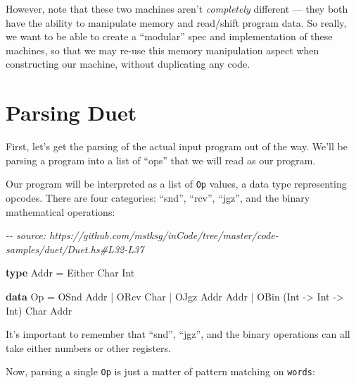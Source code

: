\documentclass[]{article}
\newenvironment{Shaded}{}{}
\newcommand{\CommentTok}[1]{\textcolor[rgb]{0.38,0.63,0.69}{\textit{#1}}}
\newcommand{\DataTypeTok}[1]{\textcolor[rgb]{0.56,0.13,0.00}{#1}}
\newcommand{\KeywordTok}[1]{\textcolor[rgb]{0.00,0.44,0.13}{\textbf{#1}}}
\newcommand{\NormalTok}[1]{#1}
\newcommand{\OperatorTok}[1]{\textcolor[rgb]{0.40,0.40,0.40}{#1}}
\newcommand{\OtherTok}[1]{\textcolor[rgb]{0.00,0.44,0.13}{#1}}
\begin{document}
However, note that these two machines aren't \emph{completely} different ---
they both have the ability to manipulate memory and read/shift program data. So
really, we want to be able to create a ``modular'' spec and implementation of
these machines, so that we may re-use this memory manipulation aspect when
constructing our machine, without duplicating any code.

\section{Parsing Duet}\label{parsing-duet}

First, let's get the parsing of the actual input program out of the way. We'll
be parsing a program into a list of ``ops'' that we will read as our program.

Our program will be interpreted as a list of \texttt{Op} values, a data type
representing opcodes. There are four categories: ``snd'', ``rcv'', ``jgz'', and
the binary mathematical operations:

\begin{Shaded}
\begin{Highlighting}[]
\CommentTok{{-}{-} source: https://github.com/mstksg/inCode/tree/master/code{-}samples/duet/Duet.hs\#L32{-}L37}

\KeywordTok{type} \DataTypeTok{Addr} \OtherTok{=} \DataTypeTok{Either} \DataTypeTok{Char} \DataTypeTok{Int}

\KeywordTok{data} \DataTypeTok{Op} \OtherTok{=} \DataTypeTok{OSnd} \DataTypeTok{Addr}
        \OperatorTok{|} \DataTypeTok{ORcv} \DataTypeTok{Char}
        \OperatorTok{|} \DataTypeTok{OJgz} \DataTypeTok{Addr} \DataTypeTok{Addr}
        \OperatorTok{|} \DataTypeTok{OBin}\NormalTok{ (}\DataTypeTok{Int} \OtherTok{{-}\textgreater{}} \DataTypeTok{Int} \OtherTok{{-}\textgreater{}} \DataTypeTok{Int}\NormalTok{) }\DataTypeTok{Char} \DataTypeTok{Addr}
\end{Highlighting}
\end{Shaded}

It's important to remember that ``snd'', ``jgz'', and the binary operations can
all take either numbers or other registers.

Now, parsing a single \texttt{Op} is just a matter of pattern matching on
\texttt{words}:
\end{document}

